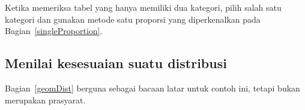 Ketika memeriksa tabel yang hanya memiliki dua kategori,
pilih salah satu kategori dan gunakan metode satu proporsi
yang diperkenalkan pada Bagian~\ref{singleProportion}.

\subsection{Menilai kesesuaian suatu distribusi}

Bagian~\ref{geomDist} berguna sebagai bacaan latar
untuk contoh ini, tetapi bukan merupakan prasyarat.


\newcommand{\spyears}{10}
\newcommand{\spdays}{1362}
\newcommand{\spdaysA}{717}
\newcommand{\spdaysB}{369}
\newcommand{\spdaysC}{155}
\newcommand{\spdaysD}{69}
\newcommand{\spdaysE}{28}
\newcommand{\spdaysF}{14}
\newcommand{\spdaysG}{10}
\newcommand{\spdaysEA}{742.5624}
\newcommand{\spdaysEB}{337.7174}
\newcommand{\spdaysEC}{153.5939}
\newcommand{\spdaysED}{69.8545}
\newcommand{\spdaysEE}{31.7698}
\newcommand{\spdaysEF}{14.4489}
\newcommand{\spdaysEG}{12.0531}
\newcommand{\spdaysEProp}{0.1127708}
\newcommand{\spdaysEPerc}{11.28\%}
\newcommand{\spUpProp}{0.5452}
\newcommand{\spUpPerc}{54.52\%}
\newcommand{\spDownProp}{0.4548}
\newcommand{\spDownPerc}{45.48\%}
\newcommand{\spdaysXSq}{4.61}
\newcommand{\spdaysN}{7}
\newcommand{\spdaysDF}{5}
\newcommand{\spdaysPvalue}{0.4650}

